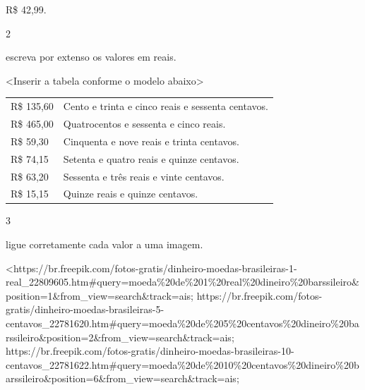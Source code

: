 R\$ 42,99.

\num{2}

escreva por extenso os valores em reais.

\textless{}Inserir a tabela conforme o modelo abaixo\textgreater{}

\begin{longtable}[]{@{}ll@{}}
\toprule
R\$ 135,60 & Cento e trinta e cinco reais e sessenta
centavos.\tabularnewline
R\$ 465,00 & Quatrocentos e sessenta e cinco reais.\tabularnewline
R\$ 59,30 & Cinquenta e nove reais e trinta centavos.\tabularnewline
R\$ 74,15 & Setenta e quatro reais e quinze centavos.\tabularnewline
R\$ 63,20 & Sessenta e três reais e vinte centavos.\tabularnewline
R\$ 15,15 & Quinze reais e quinze centavos.\tabularnewline
\bottomrule
\end{longtable}


\num{3}

ligue corretamente cada valor a uma imagem.

\textless{}https://br.freepik.com/fotos-gratis/dinheiro-moedas-brasileiras-1-real\_22809605.htm\#query=moeda\%20de\%201\%20real\%20dineiro\%20barssileiro\&position=1\&from\_view=search\&track=ais;
https://br.freepik.com/fotos-gratis/dinheiro-moedas-brasileiras-5-centavos\_22781620.htm\#query=moeda\%20de\%205\%20centavos\%20dineiro\%20barssileiro\&position=2\&from\_view=search\&track=ais;
https://br.freepik.com/fotos-gratis/dinheiro-moedas-brasileiras-10-centavos\_22781622.htm\#query=moeda\%20de\%2010\%20centavos\%20dineiro\%20barssileiro\&position=6\&from\_view=search\&track=ais;

